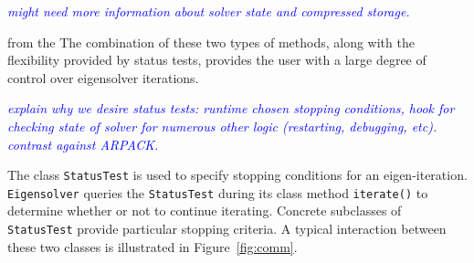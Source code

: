 \documentclass[acmtoms]{acmtrans2m}
\newcommand{\aspace}[1]{\texttt{#1}}
\newcommand{\cbcomm}[1]{\textcolor{blue}{\emph{#1}}}
\begin{document}
\cbcomm{might need more information about solver state and compressed storage.}



from the 
The combination of these two types of methods, along with the flexibility
provided by status tests, provides the user with a large degree of
control over eigensolver iterations.

\cbcomm{explain why we desire status tests: runtime chosen stopping
conditions, hook for checking state of solver for numerous other logic
(restarting, debugging, etc). contrast against ARPACK.}

The class \aspace{StatusTest} is used to specify stopping conditions for an
eigen-iteration. \aspace{Eigensolver} queries the \aspace{StatusTest} during its class
method \aspace{iterate()} to determine whether or not to continue iterating. Concrete
subclasses of \aspace{StatusTest} provide particular stopping criteria. A typical
interaction between these two classes is illustrated in Figure~\ref{fig:comm}.
\end{document}
